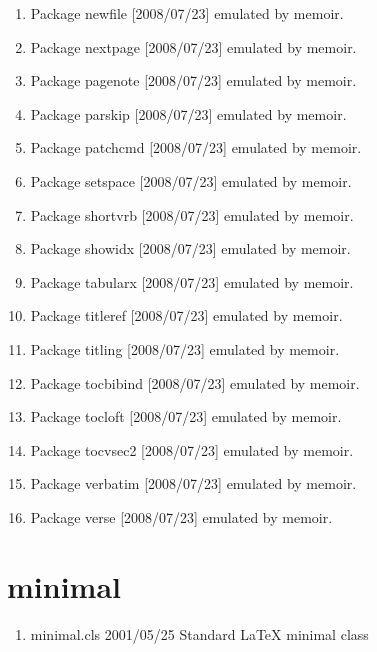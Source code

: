 \begin{enumerate}
			\item 	Package newfile [2008/07/23] emulated by memoir.
			\item 	Package nextpage [2008/07/23] emulated by memoir.
			\item 	Package pagenote [2008/07/23] emulated by memoir.
			\item 	Package parskip [2008/07/23] emulated by memoir.
			\item 	Package patchcmd [2008/07/23] emulated by memoir.
			\item 	Package setspace [2008/07/23] emulated by memoir.
			\item 	Package shortvrb [2008/07/23] emulated by memoir.
			\item 	Package showidx [2008/07/23] emulated by memoir.
			\item 	Package tabularx [2008/07/23] emulated by memoir.
			\item 	Package titleref [2008/07/23] emulated by memoir.
			\item 	Package titling [2008/07/23] emulated by memoir.
			\item 	Package tocbibind [2008/07/23] emulated by memoir.
			\item 	Package tocloft [2008/07/23] emulated by memoir.
			\item 	Package tocvsec2 [2008/07/23] emulated by memoir.
			\item 	Package verbatim [2008/07/23] emulated by memoir.
			\item 	Package verse [2008/07/23] emulated by memoir.
			\end{enumerate}
		\section{minimal}
		
	\begin{enumerate}
	\item minimal.cls 2001/05/25 Standard LaTeX minimal class
	\end{enumerate}
